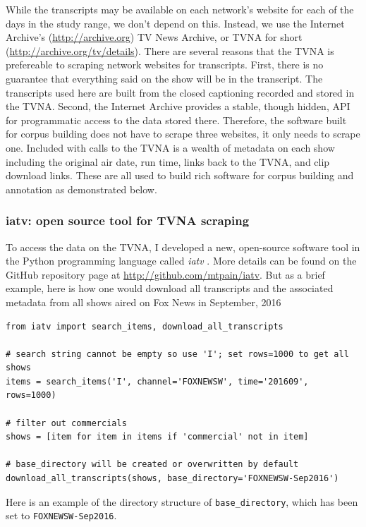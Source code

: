 While the transcripts may be available on each network's website 
for each of the days in the study range, we don't depend on this.
Instead, we use the Internet Archive's (\url{http://archive.org}) 
TV News Archive, or TVNA for short (\url{http://archive.org/tv/details}).
There are several reasons that the TVNA is prefereable to scraping network
websites for transcripts.
First, there is no guarantee that everything said on the show
will be in the transcript. The transcripts used here are built from the
closed captioning recorded and stored in the TVNA. 
Second, the Internet Archive provides a stable, though hidden, API for 
programmatic access to the data stored there. Therefore, the software built
for corpus building does not have to scrape three websites, it only needs to
scrape one. Included with calls to the TVNA is a wealth of metadata on each
show including the original air date, run time, links back to the TVNA, and
clip download links. These are all used to build rich software for corpus
building and annotation as demonstrated below.


\subsubsection{iatv: open source tool for TVNA scraping}
\label{subsec:iatv}

To access the data on the TVNA, I developed a new, open-source 
software tool in the Python programming language called \textit{iatv}
\cite{Turner2016}. More details can be found on the GitHub repository page
at \url{http://github.com/mtpain/iatv}. But as a brief example, here is
how one would download all transcripts and the associated metadata from
all shows aired on Fox News in September, 2016

\begin{verbatim}
from iatv import search_items, download_all_transcripts

# search string cannot be empty so use 'I'; set rows=1000 to get all shows 
items = search_items('I', channel='FOXNEWSW', time='201609', rows=1000)

# filter out commercials
shows = [item for item in items if 'commercial' not in item]

# base_directory will be created or overwritten by default
download_all_transcripts(shows, base_directory='FOXNEWSW-Sep2016')
\end{verbatim}

Here is an example of the directory structure of \texttt{base\_directory}, which
has been set to \texttt{FOXNEWSW-Sep2016}.

